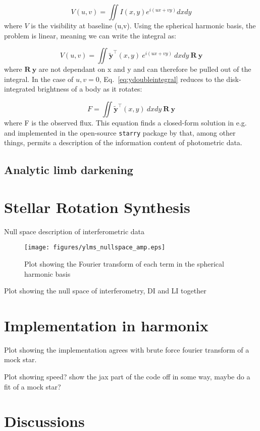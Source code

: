 \documentclass[modern]{aastex631}
\begin{document}
\begin{equation}
V(u,v) = \iint I(x,y) e^{i(ux + vy)} dxdy
\end{equation}
where $V$ is the visibility at baseline (u,v). Using the spherical harmonic basis, the problem is linear, meaning we can write the integral as:

\begin{equation} \label{eq:ydoubleintegral}
   V(u,v) = \iint \mathbf{\tilde{y}}^\top(x,y) \ e^{i(ux + vy)} \ dxdy \ \mathbf{R} \ \mathbf{y}
\end{equation} 
where $\mathbf{R} \ \mathbf{y}$ are not dependant on x and y and can therefore be pulled out of the integral. In the case of $u, v = 0$, Eq.~\ref{eq:ydoubleintegral} reduces to the disk-integrated brightness of a body as it rotates:

\begin{equation} \label{eq:ydoubleintegral}
   F = \iint \mathbf{\tilde{y}}^\top(x,y) \ dxdy \ \mathbf{R} \ \mathbf{y}
\end{equation}
where F is the observed flux. This equation finds a closed-form solution in e.g. \citep{cowan2013} and implemented in the open-source \texttt{starry} package by \citep{starry2019} that, among other things, permits a description of the information content of photometric data.

\subsection{Analytic limb darkening}

\section{Stellar Rotation Synthesis}
\label{sec:rotsynthesis}
Null space description of interferometric data

\begin{figure}[ht!]
    \begin{centering}
        \texttt{[image: figures/ylms\_nullspace\_amp.eps]}
        \caption{
            Plot showing the Fourier transform of each term in the spherical harmonic basis
        }
        \label{fig:pyramid}
    \end{centering}
\end{figure}

Plot showing the null space of interferometry, DI and LI together
\section{Implementation in harmonix}
\label{sec:harmonix}
Plot showing the implementation agrees with brute force fourier transform of a mock star. 

Plot showing speed? show the jax part of the code off in some way, maybe do a fit of a mock star?
\section{Discussions}
\label{sec:discussions}


\end{document}

